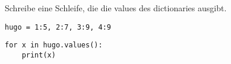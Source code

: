 \question[2] Schreibe eine Schleife, die die values des dictionaries ausgibt.

\texttt{hugo = {1:5, 2:7, 3:9, 4:9}}

\begin{solutionbox}{2cm}
\begin{lstlisting}
for x in hugo.values():
    print(x)
\end{lstlisting}
\end{solutionbox}
